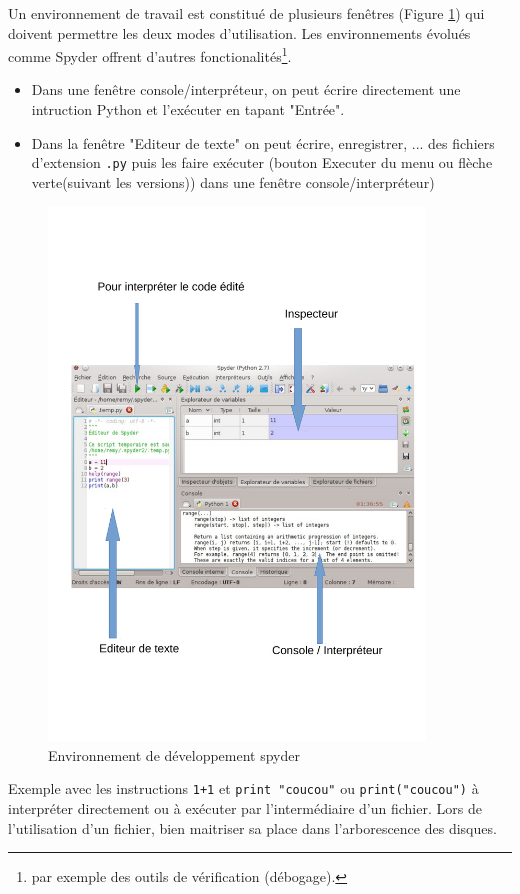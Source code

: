Un environnement de travail est constitué de plusieurs fenêtres (Figure \ref{fig:spyder}) qui doivent permettre les deux modes d'utilisation. Les environnements évolués comme Spyder offrent d'autres fonctionalités\footnote{par exemple des outils de vérification (débogage).}.
\begin{itemize}
 \item Dans une fenêtre console/interpréteur, on peut écrire directement une intruction Python et l'exécuter en tapant "Entrée". 
 \item Dans la fenêtre "Editeur de texte" on peut écrire, enregistrer, ... des fichiers d'extension \verb|.py| puis les faire exécuter (bouton Executer du menu ou flèche verte(suivant les versions)) dans une fenêtre console/interpréteur)
\end{itemize}
 
 \begin{figure}[h!]
 \centering
 \includegraphics[width=10cm,keepaspectratio=true]{./spyder.pdf}
 \caption{Environnement de développement spyder}
 \label{fig:spyder}
\end{figure}


Exemple avec les instructions \texttt{1+1} et \texttt{print "coucou"} ou \texttt{print("coucou")} à interpréter directement ou à exécuter par l'intermédiaire d'un fichier. Lors de l'utilisation d'un fichier, bien maitriser sa place dans l'arborescence des disques.

